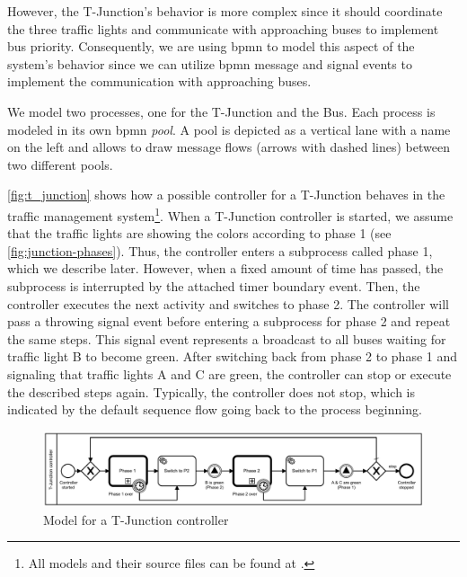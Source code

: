 \documentclass{jot}
\begin{document}
However, the T-Junction's behavior is more complex since it should coordinate the three traffic lights and communicate with approaching buses to implement bus priority.
Consequently, we are using \gls*{bpmn} to model this aspect of the system's behavior since we can utilize \gls*{bpmn} message and signal events to implement the communication with approaching buses.

We model two processes, one for the T-Junction and the Bus.
Each process is modeled in its own \gls*{bpmn} \emph{pool}.
A pool is depicted as a vertical lane with a name on the left and allows to draw message flows (arrows with dashed lines) between two different pools.

\autoref{fig:t_junction} shows how a possible controller for a T-Junction behaves in the traffic management system\footnote{All models and their source files can be found at \cite{timkrauterBehavioralConsistencyMultimodeling2022}.\label{footnote:fullModels}}.
When a T-Junction controller is started, we assume that the traffic lights are showing the colors according to phase 1 (see \autoref{fig:junction-phases}).
Thus, the controller enters a subprocess called phase 1, which we describe later.
However, when a fixed amount of time has passed, the subprocess is interrupted by the attached timer boundary event.
Then, the controller executes the next activity and switches to phase 2.
The controller will pass a throwing signal event before entering a subprocess for phase 2 and repeat the same steps.
This signal event represents a broadcast to all buses waiting for traffic light B to become green.
After switching back from phase 2 to phase 1 and signaling that traffic lights A and C are green, the controller can stop or execute the described steps again.
Typically, the controller does not stop, which is indicated by the default sequence flow going back to the process beginning.

\begin{figure}[h]
    \centering
    \includegraphics[width=1\textwidth]{figures/t-junction.pdf}
    \caption{Model for a T-Junction controller}
    \label{fig:t_junction}
\end{figure}
\end{document}
